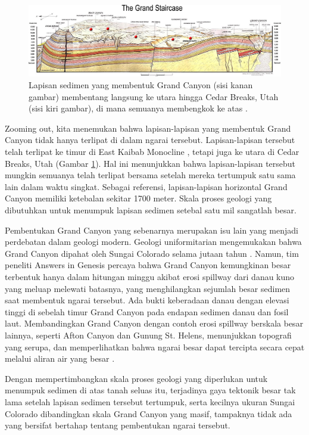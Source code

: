 \documentclass[10pt,twocolumn,letterpaper]{article}
\begin{document}
\begin{figure}
\begin{center}
\includegraphics[width=1\textwidth]{Grand_Staircase-big.jpg}
\end{center}
   \caption{Lapisan sedimen yang membentuk Grand Canyon (sisi kanan gambar) membentang langsung ke utara hingga Cedar Breaks, Utah (sisi kiri gambar), di mana semuanya membengkok ke atas \cite{50}.}
\label{fig:4}
\end{figure}
Zooming out, kita menemukan bahwa lapisan-lapisan yang membentuk Grand Canyon tidak hanya terlipat di dalam ngarai tersebut. Lapisan-lapisan tersebut telah terlipat ke timur di East Kaibab Monocline \cite{46}, tetapi juga ke utara di Cedar Breaks, Utah (Gambar \ref{fig:4}). Hal ini menunjukkan bahwa lapisan-lapisan tersebut mungkin semuanya telah terlipat bersama setelah mereka tertumpuk satu sama lain dalam waktu singkat. Sebagai referensi, lapisan-lapisan horizontal Grand Canyon memiliki ketebalan sekitar 1700 meter. Skala proses geologi yang dibutuhkan untuk menumpuk lapisan sedimen setebal satu mil sangatlah besar.

Pembentukan Grand Canyon yang sebenarnya merupakan isu lain yang menjadi perdebatan dalam geologi modern. Geologi uniformitarian mengemukakan bahwa Grand Canyon dipahat oleh Sungai Colorado selama jutaan tahun \cite{47}. Namun, tim peneliti Answers in Genesis percaya bahwa Grand Canyon kemungkinan besar terbentuk hanya dalam hitungan minggu akibat erosi spillway dari danau kuno yang meluap melewati batasnya, yang menghilangkan sejumlah besar sedimen saat membentuk ngarai tersebut. Ada bukti keberadaan danau dengan elevasi tinggi di sebelah timur Grand Canyon pada endapan sedimen danau dan fosil laut. Membandingkan Grand Canyon dengan contoh erosi spillway berskala besar lainnya, seperti Afton Canyon dan Gunung St. Helens, menunjukkan topografi yang serupa, dan memperlihatkan bahwa ngarai besar dapat tercipta secara cepat melalui aliran air yang besar \cite{48}.

Dengan mempertimbangkan skala proses geologi yang diperlukan untuk menumpuk sedimen di atas tanah seluas itu, terjadinya gaya tektonik besar tak lama setelah lapisan sedimen tersebut tertumpuk, serta kecilnya ukuran Sungai Colorado dibandingkan skala Grand Canyon yang masif, tampaknya tidak ada yang bersifat bertahap tentang pembentukan ngarai tersebut.
\end{document}
